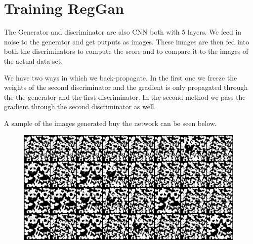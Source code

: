 \documentclass[12pt]{report}
\begin{document}
\section*{Training RegGan}

The Generator and discriminator are also CNN both with 5 layers. We feed in noise to the generator and get outputs as images. These images are then fed into both the discriminators to compute the score and to compare it to the images of the actual data set. 

We have two ways in which we back-propagate. In the first one we freeze the weights of the second discriminator and the gradient is only propagated through the the generator and the first discriminator. In the second method we pass the gradient through the second discriminator as well. 


A sample of the images generated buy the network can be seen below. 

\begin{figure}[H]
	\centering
	\includegraphics[scale=.6]{fake_samples_epoch_049}
\end{figure}
\end{document}
